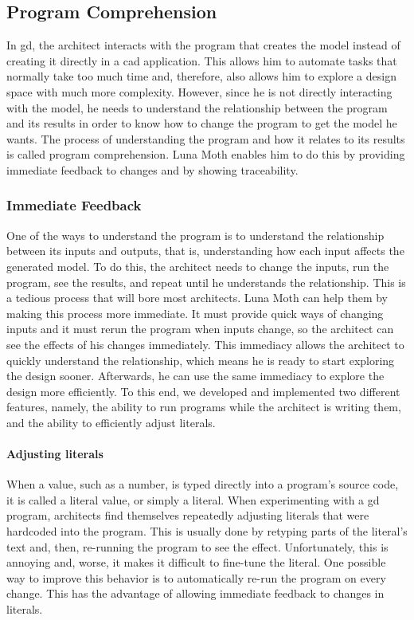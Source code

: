 \subsection{Program Comprehension}
In \gls{gd}, the architect interacts with the program that creates the model instead of creating it directly in a \gls{cad} application.
This allows him to automate tasks that normally take too much time and, therefore, also allows him to explore a design space with much more complexity.
However, since he is not directly interacting with the model, he needs to understand the relationship between the program and its results in order to know how to change the program to get the model he wants.
The process of understanding the program and how it relates to its results is called program comprehension\cite{rugaber1995program}.
Luna Moth enables him to do this by providing immediate feedback to changes and by showing traceability.


\subsubsection{Immediate Feedback}
\label{sec:immediate:feedback}
One of the ways to understand the program is to understand the relationship between its inputs and outputs, that is, understanding how each input affects the generated model.
To do this, the architect needs to change the inputs, run the program, see the results, and repeat until he understands the relationship.
This is a tedious process that will bore most architects.
Luna Moth can help them by making this process more immediate.
It must provide quick ways of changing inputs and it must rerun the program when inputs change, so the architect can see the effects of his changes immediately.
This immediacy allows the architect to quickly understand the relationship, which means he is ready to start exploring the design sooner.
Afterwards, he can use the same immediacy to explore the design more efficiently.
To this end, we developed and implemented two different features, namely, the ability to run programs while the architect is writing them, and the ability to efficiently adjust literals.

\paragraph{Adjusting literals}
When a value, such as a number, is typed directly into a program's source code, it is called a literal value, or simply a literal.
When experimenting with a \gls{gd} program, architects find themselves repeatedly adjusting literals that were hardcoded into the program.
This is usually done by retyping parts of the literal's text and, then, re-running the program to see the effect.
Unfortunately, this is annoying and, worse, it makes it difficult to fine-tune the literal.
One possible way to improve this behavior is to automatically re-run the program on every change.
This has the advantage of allowing immediate feedback to changes in literals.

